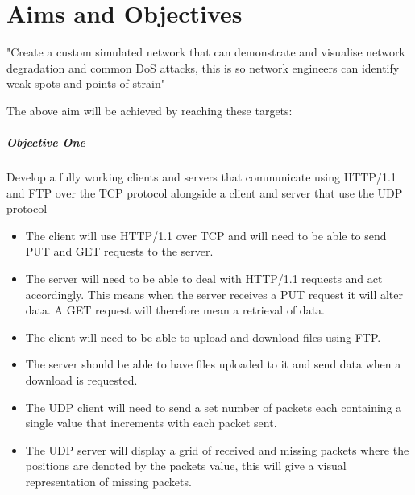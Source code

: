\chapter{Aims and Objectives}
\begin{center}
"Create a custom simulated network that can demonstrate and visualise network degradation and common DoS attacks, this is so network engineers can identify weak spots and points of strain"
\end{center}


The above aim will be achieved by reaching these targets:

\paragraph{Objective One}
Develop a fully working clients and servers that communicate using HTTP/1.1 \citep{HTTP} and FTP over the TCP protocol alongside a client and server that use the UDP protocol

\begin{itemize}
\item The client will use HTTP/1.1  over TCP and will need to be able to send PUT and GET requests to the server.
\item The server will need to be able to deal with HTTP/1.1 requests and act accordingly. This means when the server receives a PUT request it will alter data. A GET request will therefore mean a retrieval of data. 
\item The client will need to be able to upload and download files using FTP.
\item The server should be able to have files uploaded to it and send data when a download is requested.
\item The UDP client will need to send a set number of packets each containing a single value that increments with each packet sent.
\item The UDP server will display a grid of received and missing packets where the positions are denoted by the packets value, this will give a visual representation of missing packets.
\end{itemize}  

